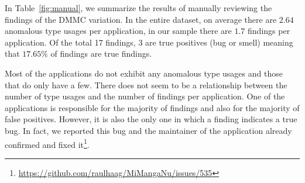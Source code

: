 \begin{table}[t]
    \centering
    \caption{The results of the manual evaluation}\label{fig:manual}
\end{table}

In Table~\ref{fig:manual}, we summarize the results of manually reviewing the findings of the $\text{DMMC}$ variation.
In the entire dataset, on average there are $2.64$ anomalous type usages per application, in our sample there are $1.7$ findings per application.
Of the total 17 findings, 3 are true positives (bug or smell) meaning that $17.65\%$ of findings are true findings.

Most of the applications do not exhibit any anomalous type usages and those that do only have a few.
There does not seem to be a relationship between the number of type usages and the number of findings per application.
One of the applications is responsible for the majority of findings and also for the majority of false positives.
However, it is also the only one in which a finding indicates a true bug.
In fact, we reported this bug and the maintainer of the application already confirmed and fixed it\footnote{\url{https://github.com/raulhaag/MiMangaNu/issues/535}}.

